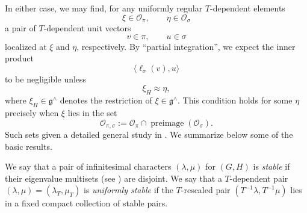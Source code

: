 \documentclass[reqno]{amsart} 
\numberwithin{equation}{section}
\numberwithin{theorem}{section}
\begin{document}
In either case, we may find, for any uniformly regular $T$-dependent elements
\begin{equation*}
  \xi \in \mathcal{O}_\pi, \qquad  \eta \in \mathcal{O}_\sigma
\end{equation*}
a pair of $T$-dependent unit vectors
\begin{equation*}
  v \in \pi, \qquad u \in \sigma 
\end{equation*}
localized at $\xi$ and $\eta$, respectively.  By ``partial integration'', we expect the inner product
\begin{equation*}
  \langle \ell_\sigma(v), u \rangle
\end{equation*}
to be negligible unless
\begin{equation*}
  \xi_H \approx \eta,
\end{equation*}
where $\xi_H \in \mathfrak{g}^\wedge$ denotes the restriction of $\xi \in \mathfrak{g}^\wedge$.  This condition holds for some $\eta$ precisely when $\xi$ lies in the set
\begin{equation*}
  \mathcal{O}_{\pi,\sigma} := \mathcal{O}_\pi \cap \operatorname{preimage}(\mathcal{O}_\sigma).
\end{equation*}
Such sets given a detailed general study in \cite{nelson-venkatesh-1}.  We summarize below some of the basic results.

\begin{definition}
  We say that a pair of infinitesimal characters $(\lambda,\mu)$ for $(G,H)$ is \emph{stable} if their eigenvalue multisets (see \cite[\S13.4.1]{nelson-venkatesh-1}) are disjoint.  We say that a $T$-dependent pair $(\lambda,\mu) = (\lambda_T, \mu_T)$ is \emph{uniformly stable} if the $T$-rescaled pair $(T^{-1} \lambda, T^{-1} \mu)$ lies in a fixed compact collection of stable pairs.
\end{definition}
\end{document}
